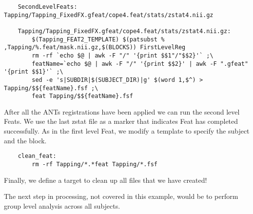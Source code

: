 \begin{lstlisting}
	SecondLevelFeats: Tapping/Tapping_FixedFX.gfeat/cope4.feat/stats/zstat4.nii.gz

	Tapping/Tapping_FixedFX.gfeat/cope4.feat/stats/zstat4.nii.gz:
        $(Tapping_FEAT2_TEMPLATE) $(patsubst % ,Tapping/%.feat/mask.nii.gz,$(BLOCKS)) FirstLevelReg
		rm -rf `echo $@ | awk -F "/" '{print $$1"/"$$2}'` ;\
		featName=`echo $@ | awk -F "/" '{print $$2}' | awk -F ".gfeat" '{print $$1}'` ;\
		sed -e 's|SUBDIR|$(SUBJECT_DIR)|g' $(word 1,$^) > Tapping/$${featName}.fsf ;\
		feat Tapping/$${featName}.fsf
\end{lstlisting}
After all the ANTs registrations have been applied we can run the
second level Feats. We use the last zstat file as a marker that
indicates Feat has completed successfully. As in the first level Feat, we modify a template
to specify the subject and the block.

\begin{lstlisting}
	clean_feat:
		rm -rf Tapping/*.*feat Tapping/*.fsf
\end{lstlisting}

Finally, we define a target to clean up all files that we have
created! 

The next step in processing, not covered in this example, would be to
perform group level analysis across all subjects.